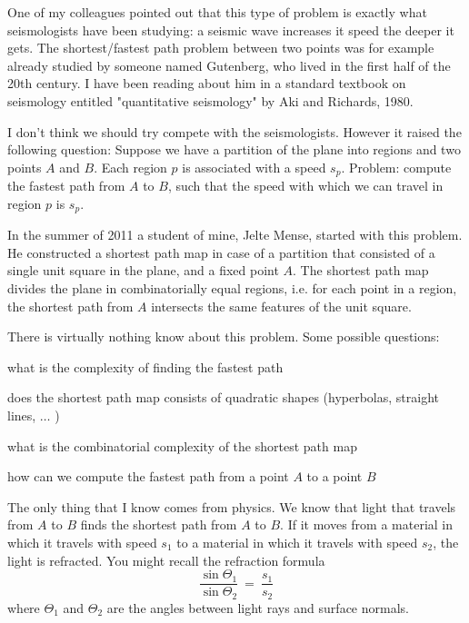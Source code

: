 \documentclass{patmorin}
\begin{document}
One of my colleagues pointed out that this type  of problem  is exactly
what seismologists have been studying:  a seismic wave increases it
speed the deeper it gets.  The shortest/fastest path problem between
two points was for example already studied by someone named Gutenberg,
who lived in the first half of the 20th century.  I have been reading
about him in a standard textbook on seismology entitled "quantitative
seismology" by Aki and Richards, 1980.

I don't think we should try compete with the seismologists.  However it
raised the following question: Suppose we have a partition of the plane
into regions and two points $A$ and $B$.  Each region $p$ is associated
with a speed $s_p$.  Problem: compute the fastest path from $A$ to $B$,
such that the speed with which we can travel in region $p$ is $s_p$.

In the summer of 2011 a student of mine, Jelte Mense, started with this
problem. He constructed a shortest path map in case of a partition that
consisted of a single unit square in the plane, and a fixed point $A$.
The shortest path map divides the plane in combinatorially equal regions,
i.e. for each point in a region, the shortest path from $A$ intersects
the same features of the unit square.

There is virtually nothing know about this problem. Some possible 
questions:  

\begin{op}
  what is the complexity of finding the fastest path
\end{op}

\begin{op}
  does the shortest path map consists of quadratic shapes (hyperbolas,
  straight lines, $\ldots$ )
\end{op}

\begin{op}
  what is the combinatorial complexity of the shortest path map
\end{op}

\begin{op}
  how can we compute the fastest path from a point $A$ to a point $B$
\end{op}


The only thing that I know comes from physics. We know that light that
travels from $A$ to $B$ finds the shortest path from $A$ to $B$. If it
moves from a material in which it travels with speed $s_1$ to a material
in which it travels with speed $s_2$, the light is refracted. You might
recall the refraction formula
\[ 
   \frac{\sin \Theta_1}{\sin \Theta_2} ~=~ \frac{s_1}{s_2}
\]
where $\Theta_1$ and $\Theta_2$ are the angles between light rays and
surface normals.
\end{document}

